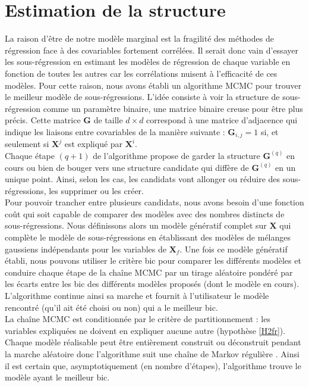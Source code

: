 \documentclass[12pt,a4paper]{report}
\begin{document}
	 \section{Estimation de la structure}
		La raison d'être de notre modèle marginal est la fragilité des méthodes de régression face à des covariables fortement corrélées. Il serait donc vain d'essayer les sous-régression en estimant les modèles de régression de chaque variable en fonction de toutes les autres car les corrélations nuisent à l'efficacité de ces modèles. Pour cette raison, nous avons établi un algorithme MCMC pour trouver le meilleur modèle de sous-régressions. L'idée consiste à voir la structure de sous-régression comme un paramètre binaire, une matrice binaire creuse pour être plus précis. Cette matrice $\boldsymbol{G}$ de taille $d\times d$ correspond à une matrice d'adjacence qui indique les liaisons entre covariables de la manière suivante : $\boldsymbol{G}_{i,j}=1$ si, et seulement si $\boldsymbol{X}^j$ est expliqué par $\boldsymbol{X}^i$. \\
		
		Chaque étape $(q+1)$ de l'algorithme propose de garder la structure $\boldsymbol{G}^{(q)}$ en cours ou bien de bouger vers une structure candidate qui diffère de $\boldsymbol{G}^{(q)}$ en un unique point. Ainsi, selon les cas, les candidats vont allonger ou réduire des sous-régressions, les supprimer ou les créer. \\
		Pour pouvoir trancher entre plusieurs candidats, nous avons besoin d'une fonction coût qui soit capable de comparer des modèles avec des nombres distincts de sous-régressions. Nous définissons alors un modèle génératif complet sur $\boldsymbol{X}$ qui complète le modèle de sous-régressions en établissant des modèles de mélanges gaussiens indépendants pour les variables de $\boldsymbol{X}_{f}$. Une fois ce modèle génératif établi, nous pouvons utiliser le critère {\sc bic} pour comparer les différents modèles et conduire chaque étape de la chaîne MCMC par un tirage aléatoire pondéré par les écarts entre les {\sc bic} des différents modèles proposés (dont le modèle en cours). L'algorithme continue ainsi sa marche et fournit à l'utilisateur le modèle rencontré (qu'il ait été choisi ou non) qui a le meilleur {\sc bic}. \\
		
		La chaîne MCMC est conditionnée par le critère de partitionnement : les variables expliquées ne doivent en expliquer aucune autre (hypothèse \ref{H2fr}). Chaque modèle réalisable peut être entièrement construit ou déconstruit pendant la marche aléatoire donc l'algorithme suit une chaîne de Markov régulière \cite{grinstead1997introduction}. Ainsi il est certain que, asymptotiquement (en nombre d'étapes), l'algorithme trouve le modèle ayant le meilleur {\sc bic}.
\end{document}
